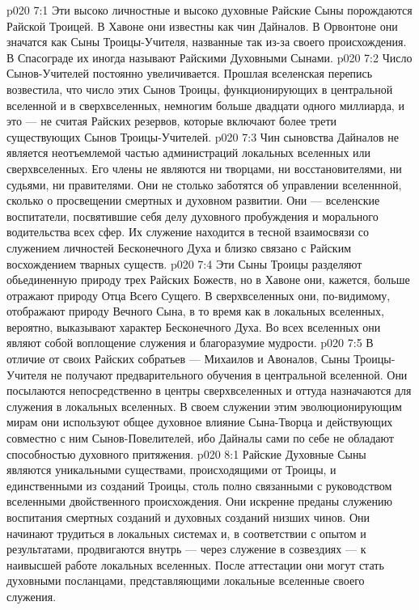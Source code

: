 \vs p020 7:1 Эти высоко личностные и высоко духовные Райские Сыны порождаются Райской Троицей. В Хавоне они известны как чин Дайналов. В Орвонтоне они значатся как Сыны Троицы\hyp{}Учителя, названные так из\hyp{}за своего происхождения. В Спасограде их иногда называют Райскими Духовными Сынами.
\vs p020 7:2 Число Сынов\hyp{}Учителей постоянно увеличивается. Прошлая вселенская перепись возвестила, что число этих Сынов Троицы, функционирующих в центральной вселенной и в сверхвселенных, немногим больше двадцати одного миллиарда, и это --- не считая Райских резервов, которые включают более трети существующих Сынов Троицы\hyp{}Учителей.
\vs p020 7:3 Чин сыновства Дайналов не является неотъемлемой частью администраций локальных вселенных или сверхвселенных. Его члены не являются ни творцами, ни восстановителями, ни судьями, ни правителями. Они не столько заботятся об управлении вселеннной, сколько о просвещении смертных и духовном развитии. Они --- вселенские воспитатели, посвятившие себя делу духовного пробуждения и морального водительства всех сфер. Их служение находится в тесной взаимосвязи со служением личностей Бесконечного Духа и близко связано с Райским восхождением тварных существ.
\vs p020 7:4 Эти Сыны Троицы разделяют обьединенную природу трех Райских Божеств, но в Хавоне они, кажется, больше отражают природу Отца Всего Сущего. В сверхвселенных они, по\hyp{}видимому, отображают природу Вечного Сына, в то время как в локальных вселенных, вероятно, выказывают характер Бесконечного Духа. Во всех вселенных они являют собой воплощение служения и благоразумие мудрости.
\vs p020 7:5 В отличие от своих Райских собратьев --- Михаилов и Авоналов, Сыны Троицы\hyp{}Учителя не получают предварительного обучения в центральной вселенной. Они посылаются непосредственно в центры сверхвселенных и оттуда назначаются для служения в локальных вселенных. В своем служении этим эволюционирующим мирам они используют общее духовное влияние Сына\hyp{}Творца и действующих совместно с ним Сынов\hyp{}Повелителей, ибо Дайналы сами по себе не обладают способностью духовного притяжения.
\vs p020 8:1 Райские Духовные Сыны являются уникальными существами, происходящими от Троицы, и единственными из созданий Троицы, столь полно связанными с руководством вселенными двойственного происхождения. Они искренне преданы служению воспитания смертных созданий и духовных созданий низших чинов. Они начинают трудиться в локальных системах и, в соответствии с опытом и результатами, продвигаются внутрь --- через служение в созвездиях --- к наивысшей работе локальных вселенных. После аттестации они могут стать духовными посланцами, представляющими локальные вселенные своего служения.

